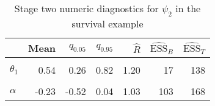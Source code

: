 \begin{table}

\caption{\label{tab:surv-stage-two-diag-psi-2}Stage two numeric diagnostics for $\psi_{2}$ in the survival example}
\centering
\begin{tabular}[t]{lrrrrrr}
\toprule
  & Mean & $q_{0.05}$ & $q_{0.95}$ & $\widehat{R}$ & $\widehat{\text{ESS}}_{B}$ & $\widehat{\text{ESS}}_{T}$\\
\midrule
\cellcolor{gray!6}{$\theta_{0}$} & \cellcolor{gray!6}{0.42} & \cellcolor{gray!6}{-0.46} & \cellcolor{gray!6}{1.29} & \cellcolor{gray!6}{1.10} & \cellcolor{gray!6}{32} & \cellcolor{gray!6}{133}\\
$\theta_{1}$ & 0.54 & 0.26 & 0.82 & 1.20 & 17 & 138\\
\cellcolor{gray!6}{$\gamma$} & \cellcolor{gray!6}{16.33} & \cellcolor{gray!6}{14.46} & \cellcolor{gray!6}{18.08} & \cellcolor{gray!6}{1.02} & \cellcolor{gray!6}{139} & \cellcolor{gray!6}{244}\\
$\alpha$ & -0.23 & -0.52 & 0.04 & 1.03 & 103 & 168\\
\bottomrule
\end{tabular}
\end{table}